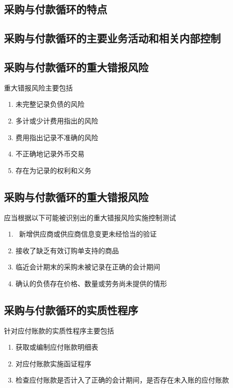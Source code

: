 \documentclass[UTF8,12pt]{ctexart}
\numberwithin{equation}{section} %
\numberwithin{figure}{section}
\numberwithin{table}{section}
\begin{document}
	\subsection{采购与付款循环的特点}
	
	\subsection{采购与付款循环的主要业务活动和相关内部控制}
	
	\subsection{采购与付款循环的重大错报风险}
	重大错报风险主要包括
	\begin{enumerate}
		\item 未完整记录负债的风险
		
		\item 多计或少计费用指出的风险
		
		\item 费用指出记录不准确的风险
		
		\item 不正确地记录外币交易
		
		\item 存在为记录的权利和义务
		
	\end{enumerate}
	
	\subsection{采购与付款循环的重大错报风险}
	应当根据以下可能被识别出的重大错报风险实施控制测试
	\begin{enumerate}
		\item  新增供应商或供应商信息变更未经恰当的验证
		
		\item 接收了缺乏有效订购单支持的商品
		
		\item 临近会计期末的采购未被记录在正确的会计期间
		
		\item 确认的负债存在价格、数量或劳务尚未提供的情形
	\end{enumerate}
	
	\subsection{采购与付款循环的实质性程序}
	针对应付账款的实质性程序主要包括
	\begin{enumerate}
		\item 获取或编制应付账款明细表
		
		\item 对应付账款实施函证程序
		
		\item 检查应付账款是否计入了正确的会计期间，是否存在未入账的应付账款
	\end{enumerate}
	
\end{document}
